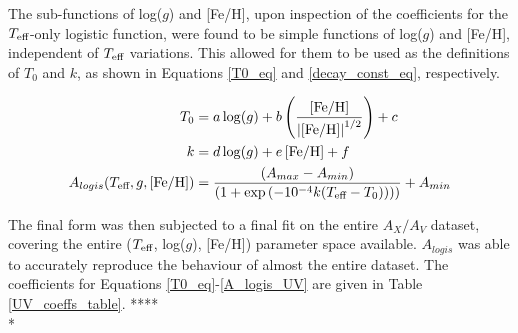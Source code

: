 \documentclass[12pt, a4paper]{report}
\begin{document}
The sub-functions of log($g$) and [Fe/H], upon inspection of the coefficients for the $T_{\textnormal{eff}}$-only logistic function, were found to be simple functions of log($g$) and [Fe/H], independent of $T_{\textnormal{eff}}$ variations. This allowed for them to be used as the definitions of $T_{0}$ and $k$, as shown in Equations \ref{T0_eq} and \ref{decay_const_eq}, respectively.

\begin{align}
T_{\textnormal{0}} &= a\log(g) + b\left(\frac{\left[\textnormal{Fe/H}\right]}{\left|\left[\textnormal{Fe/H}\right]\right|^{1/2}}\right) + c \label{T0_eq}\\
k &= d\log(g) + e\left[\textnormal{Fe/H}\right] + f \label{decay_const_eq}\\
A_{logis}(T_{\textnormal{eff}},g,\left[\textnormal{Fe/H}\right]) &= \frac{(A_{max}-A_{min})}{( 1 + \exp{(-10^{-4} k(T_{\textnormal{eff}}-T_{\textnormal{0}})) ) )}} + A_{min} \label{A_logis_UV}
\end{align}

The final form was then subjected to a final fit on the entire $A_{X}/A_{V}$ dataset, covering the entire ($T_{\textnormal{eff}}$,  log($g$), [Fe/H]) parameter space available. $A_{logis}$ was able to accurately reproduce the behaviour of almost the entire dataset. The coefficients for Equations \ref{T0_eq}-\ref{A_logis_UV} are given in Table \ref{UV_coeffs_table}. **** \\*
\end{document}
